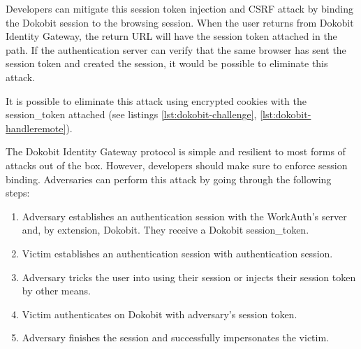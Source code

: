 Developers can mitigate this session token injection and CSRF attack by binding the Dokobit session to the browsing session. When the user returns from Dokobit Identity Gateway, the return URL will have the session token attached in the path. If the authentication server can verify that the same browser has sent the session token and created the session, it would be possible to eliminate this attack.

It is possible to eliminate this attack using encrypted cookies with the session\_token attached (see listings \ref{lst:dokobit-challenge}, \ref{lst:dokobit-handleremote}).


The Dokobit Identity Gateway protocol is simple and resilient to most forms of attacks out of the box. However, developers should make sure to enforce session binding. Adversaries can perform this attack by going through the following steps:

\begin{enumerate}
  \item Adversary establishes an authentication session with the WorkAuth's server and, by extension, Dokobit. They receive a Dokobit session\_token.
  \item Victim establishes an authentication session with authentication session.
  \item Adversary tricks the user into using their session or injects their session token by other means.
  \item Victim authenticates on Dokobit with adversary's session token.
  \item Adversary finishes the session and successfully impersonates the victim.
\end{enumerate}
